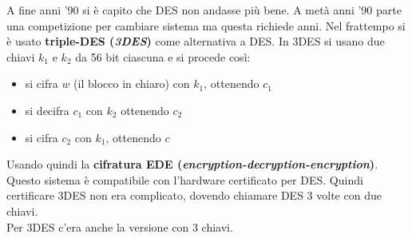 \documentclass[a4paper,12pt, oneside]{book}
\begin{document}
A fine anni '90 si è capito che DES non andasse più bene. A metà anni '90 parte
una competizione per cambiare sistema ma questa richiede anni. Nel frattempo si
è usato \textbf{triple-DES (\textit{3DES})} come alternativa a DES. In 3DES si
usano due chiavi $k_1$ e $k_2$ da 56 bit ciascuna e si procede così:
\begin{itemize}
  \item si cifra $w$ (il blocco in chiaro) con $k_1$, ottenendo $c_1$
  \item si decifra $c_1$ con $k_2$ ottenendo $c_2$
  \item si cifra $c_2$ con $k_1$, ottenendo $c$
\end{itemize}
Usando quindi la \textbf{cifratura EDE
  (\textit{encryption-decryption-encryption})}. \\
Questo sistema è compatibile con l'hardware certificato per DES. Quindi
certificare 3DES non era complicato, dovendo chiamare DES 3 volte con due
chiavi.\\ 
Per 3DES c'era anche la versione con 3 chiavi.
\end{document}
